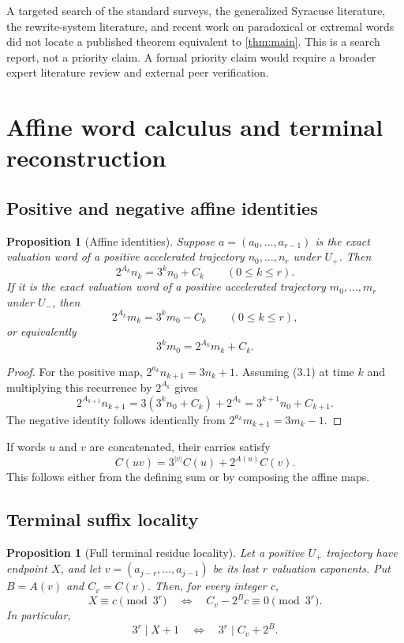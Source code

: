 \documentclass[11pt]{article}
\newtheorem{proposition}[theorem]{Proposition}
\theoremstyle{definition}
\theoremstyle{remark}
\newcommand{\Up}{U_{+}}
\newcommand{\Um}{U_{-}}
\begin{document}
A targeted search of the standard surveys, the generalized Syracuse
literature, the rewrite-system literature, and recent work on paradoxical or
extremal words~\cite{RozierTerracol2025,FernandezIbanez2026,Kramer2026}
did not locate a published theorem equivalent to \cref{thm:main}.  This is a
search report, not a priority claim.  A formal priority claim would require a
broader expert literature review and external peer verification.

\section{Affine word calculus and terminal reconstruction}\label{sec:affine}

\subsection{Positive and negative affine identities}

\begin{proposition}[Affine identities]\label{prop:affine}
Suppose $a=(a_0,\ldots,a_{r-1})$ is the exact valuation word of a positive
accelerated trajectory $n_0,\ldots,n_r$ under $\Up$.  Then
\[
 2^{A_k}n_k=3^k n_0+C_k\qquad(0\le k\le r).          \tag{3.1}
\]
If it is the exact valuation word of a positive accelerated trajectory
$m_0,\ldots,m_r$ under $\Um$, then
\[
 2^{A_k}m_k=3^k m_0-C_k\qquad(0\le k\le r),          \tag{3.2}
\]
or equivalently
\[
 3^k m_0=2^{A_k}m_k+C_k.                              \tag{3.3}
\]
\end{proposition}

\begin{proof}
For the positive map,
$2^{a_k}n_{k+1}=3n_k+1$.  Assuming \textup{(3.1)} at time $k$ and multiplying
this recurrence by $2^{A_k}$ gives
\[
 2^{A_{k+1}}n_{k+1}
 =3(3^k n_0+C_k)+2^{A_k}
 =3^{k+1}n_0+C_{k+1}.
\]
The negative identity follows identically from
$2^{a_k}m_{k+1}=3m_k-1$.
\end{proof}

If words $u$ and $v$ are concatenated, their carries satisfy
\[
 C(uv)=3^{|v|}C(u)+2^{A(u)}C(v).                     \tag{3.4}
\]
This follows either from the defining sum or by composing the affine maps.

\subsection{Terminal suffix locality}

\begin{proposition}[Full terminal residue locality]\label{prop:locality}
Let a positive $\Up$ trajectory have endpoint $X$, and let
$v=(a_{j-r},\ldots,a_{j-1})$ be its last $r$ valuation exponents.  Put
$B=A(v)$ and $C_v=C(v)$.  Then, for every integer $c$,
\[
 X\equiv c\pmod{3^r}
 \quad\Longleftrightarrow\quad
 C_v-2^B c\equiv0\pmod{3^r}.                         \tag{3.5}
\]
In particular,
\[
 3^r\mid X+1
 \quad\Longleftrightarrow\quad
 3^r\mid C_v+2^B.                                    \tag{3.6}
\]
\end{proposition}
\end{document}
